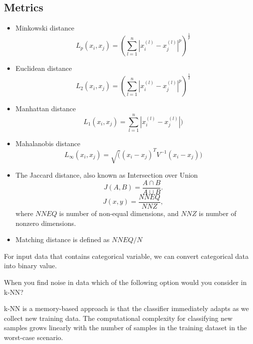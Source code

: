 \begin{refsection}
	
\subsection{Metrics}

\begin{definition}\hfill
\begin{itemize}
	\item Minkowski distance
	$$L_{p}\left(x_{i}, x_{j}\right)=\left(\sum_{l=1}^{n}\left|x_{i}^{(l)}-x_{j}^{(l)}\right|^{p}\right)^{\frac{1}{p}}$$
	\item Euclidean distance
		$$L_{2}\left(x_{i}, x_{j}\right)=\left(\sum_{l=1}^{n}\left|x_{i}^{(l)}-x_{j}^{(l)}\right|^{p}\right)^{\frac{1}{2}}$$
	\item Manhattan distance	
		$$L_{1}\left(x_{i}, x_{j}\right)=\sum_{l=1}^{n}|x_{i}^{(l)}-x_{j}^{(l)}|)$$
	\item Mahalanobis distance	
	$$L_{\infty}\left(x_{i}, x_{j}\right)=\sqrt((x_i-x_j)^TV^{-1}(x_i-x_j))$$
\end{itemize}
\end{definition}


\begin{definition}\cite{choi2010survey}
\begin{itemize}
	\item The Jaccard distance, also known as Intersection over Union
	$$J(A, B) = \frac{A\cap B}{A\cup B}.$$
	$$J(x, y) = \frac{NNEQ}{NNZ},$$
where $NNEQ$ is number of non-equal dimensions, and $NNZ$ is 
	number of nonzero dimensions.
	\item Matching distance is defined as $NNEQ/N$
\end{itemize}	
\end{definition}

\begin{remark} For input data that contains categorical variable, we can convert categorical data into binary value.	
\end{remark}








When you find noise in data which of the following option would you consider in k-NN?


k-NN is a memory-based approach is that the classifier immediately adapts as we collect new training data.
The computational complexity for classifying new samples grows linearly with the number of samples in the training dataset in the worst-case scenario.


\end{refsection}
